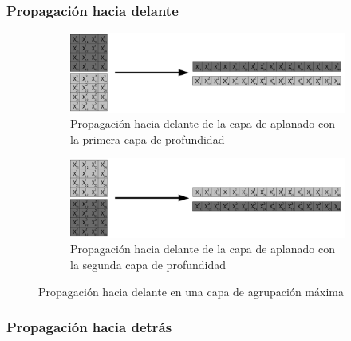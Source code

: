 \subsubsection{Propagación hacia delante}
\begin{figure}[H]
	\centering
	\begin{subfigure}{.5\textwidth}
		\hspace{-10mm}
		\includegraphics[width=2\linewidth]{imagenes/flatten_1.jpg}  
		\caption{Propagación hacia delante de la capa de aplanado con la primera capa de profundidad}
	\end{subfigure}
	\begin{subfigure}{.5\textwidth}
		\hspace{-10mm}
		\includegraphics[width=2\linewidth]{imagenes/flatten_2.jpg}  
		\caption{Propagación hacia delante de la capa de aplanado con la segunda capa de profundidad}
	\end{subfigure}
	
	\caption{Propagación hacia delante en una capa de agrupación máxima}
	\label{fig:forward_prop_flatten_canales_profundidad}
\end{figure}

\cite{flatten_forward}

\subsubsection{Propagación hacia detrás}

